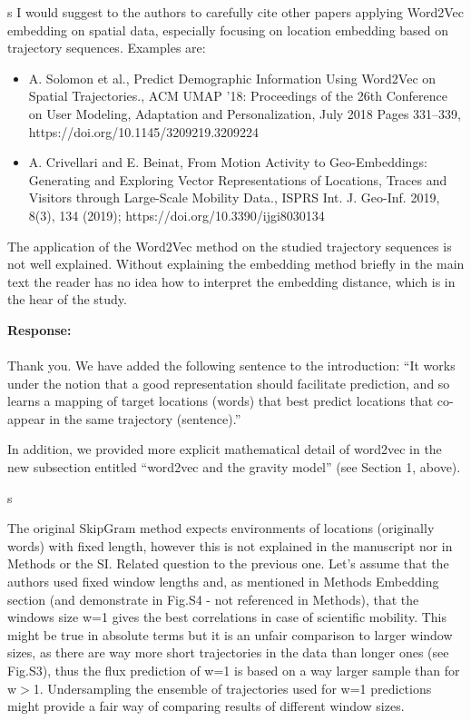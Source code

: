 \documentclass[12pt,a4paper]{article}
\newcounter{comment}[subsection]
\newcommand{\response}[1]{{\noindent \textbf{Response:} \\ \\ \noindent #1}}
\newcommand{\rcomment}[1]{%
\vspace{10pt}
\begin{sectionbox}
s #1
\end{sectionbox}
}
\begin{document}
\rcomment{
	I would suggest to the authors to carefully cite other papers applying Word2Vec embedding on spatial data, especially focusing on location embedding based on trajectory sequences. Examples are:
	\begin{itemize}
		\item A. Solomon et al., Predict Demographic Information Using Word2Vec on Spatial Trajectories., ACM UMAP '18: Proceedings of the 26th Conference on User Modeling, Adaptation and Personalization, July 2018 Pages 331–339, https://doi.org/10.1145/3209219.3209224
		\item A. Crivellari and E. Beinat, From Motion Activity to Geo-Embeddings: Generating and Exploring Vector Representations of Locations, Traces and Visitors through Large-Scale Mobility Data., ISPRS Int. J. Geo-Inf. 2019, 8(3), 134 (2019); https://doi.org/10.3390/ijgi8030134

	\end{itemize}

	The application of the Word2Vec method on the studied trajectory sequences is not well explained. Without explaining the embedding method briefly in the main text the reader has no idea how to interpret the embedding distance, which is in the hear of the study.

}

\response{Thank you.
	We have added the following sentence to the introduction: “It works under the notion that a good representation should facilitate prediction, and so learns a mapping of target locations (words) that best predict locations that co-appear in the same trajectory (sentence).”

	In addition, we provided more explicit mathematical detail of word2vec in the new subsection entitled “word2vec and the gravity model” (see Section 1, above).

}

\rcomment{

	The original SkipGram method expects environments of locations (originally words) with fixed length, however this is not explained in the manuscript nor in Methods or the SI.
	Related question to the previous one. Let’s assume that the authors used fixed window lengths and, as mentioned in Methods Embedding section (and demonstrate in Fig.S4 - not referenced in Methods), that the windows size w=1 gives the best correlations in case of scientific mobility. This might be true in absolute terms but it is an unfair comparison to larger window sizes, as there are way more short trajectories in the data than longer ones (see Fig.S3), thus the flux prediction of w=1 is based on a way larger sample than for w$>$1. Undersampling the ensemble of trajectories used for w=1 predictions might provide a fair way of comparing results of different window sizes.
}
\end{document}
